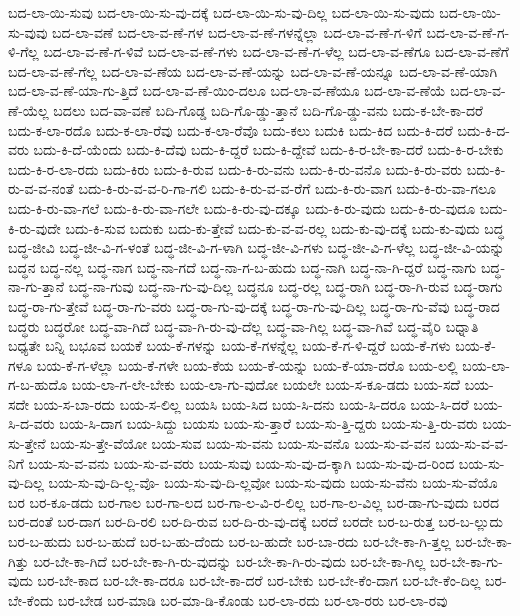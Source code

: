 {ಬದ-ಲಾ-ಯಿ-ಸುವು
ಬದ-ಲಾ-ಯಿ-ಸು-ವು-ದಕ್ಕೆ
ಬದ-ಲಾ-ಯಿ-ಸು-ವು-ದಿಲ್ಲ
ಬದ-ಲಾ-ಯಿ-ಸು-ವುದು
ಬದ-ಲಾ-ಯಿ-ಸು-ವುವು
ಬದ-ಲಾ-ವಣೆ
ಬದ-ಲಾ-ವ-ಣೆ-ಗಳ
ಬದ-ಲಾ-ವ-ಣೆ-ಗಳನ್ನೆಲ್ಲಾ
ಬದ-ಲಾ-ವ-ಣೆ-ಗ-ಳಿಗೆ
ಬದ-ಲಾ-ವ-ಣೆ-ಗ-ಳಿ-ಗೆಲ್ಲ
ಬದ-ಲಾ-ವ-ಣೆ-ಗ-ಳಿವೆ
ಬದ-ಲಾ-ವ-ಣೆ-ಗಳು
ಬದ-ಲಾ-ವ-ಣೆ-ಗ-ಳೆಲ್ಲ
ಬದ-ಲಾ-ವ-ಣೆಗೂ
ಬದ-ಲಾ-ವ-ಣೆಗೆ
ಬದ-ಲಾ-ವ-ಣೆ-ಗೆಲ್ಲ
ಬದ-ಲಾ-ವ-ಣೆಯ
ಬದ-ಲಾ-ವ-ಣೆ-ಯನ್ನು
ಬದ-ಲಾ-ವ-ಣೆ-ಯನ್ನೂ
ಬದ-ಲಾ-ವ-ಣೆ-ಯಾಗಿ
ಬದ-ಲಾ-ವ-ಣೆ-ಯಾ-ಗು-ತ್ತಿದೆ
ಬದ-ಲಾ-ವ-ಣೆ-ಯಿಂ-ದಲೂ
ಬದ-ಲಾ-ವ-ಣೆಯೂ
ಬದ-ಲಾ-ವ-ಣೆಯೆ
ಬದ-ಲಾ-ವ-ಣೆ-ಯೆಲ್ಲ
ಬದಲು
ಬದ-ವಾ-ವಣೆ
ಬದಿ-ಗೊಡ್ಡ
ಬದಿ-ಗೊ-ಡ್ಡು-ತ್ತಾನೆ
ಬದಿ-ಗೊ-ಡ್ಡು-ವನು
ಬದು-ಕ-ಬೇ-ಕಾ-ದರೆ
ಬದು-ಕ-ಲಾ-ರದೊ
ಬದು-ಕ-ಲಾ-ರೆವು
ಬದು-ಕ-ಲಾ-ರೆವೊ
ಬದು-ಕಲು
ಬದುಕಿ
ಬದು-ಕಿದ
ಬದು-ಕಿ-ದರೆ
ಬದು-ಕಿ-ದ-ವರು
ಬದು-ಕಿ-ದೆ-ಯೆಂದು
ಬದು-ಕಿ-ದೆವು
ಬದು-ಕಿ-ದ್ದರೆ
ಬದು-ಕಿ-ದ್ದೇವೆ
ಬದು-ಕಿ-ರ-ಬೇ-ಕಾ-ದರೆ
ಬದು-ಕಿ-ರ-ಬೇಕು
ಬದು-ಕಿ-ರ-ಲಾ-ರದು
ಬದು-ಕಿರು
ಬದು-ಕಿ-ರುವ
ಬದು-ಕಿ-ರು-ವನು
ಬದು-ಕಿ-ರು-ವನೊ
ಬದು-ಕಿ-ರು-ವರು
ಬದು-ಕಿ-ರು-ವ-ವ-ನಂತೆ
ಬದು-ಕಿ-ರು-ವ-ವ-ರಿ-ಗಾ-ಗಲಿ
ಬದು-ಕಿ-ರು-ವ-ವ-ರೆಗೆ
ಬದು-ಕಿ-ರು-ವಾಗ
ಬದು-ಕಿ-ರು-ವಾ-ಗಲೂ
ಬದು-ಕಿ-ರು-ವಾ-ಗಲೆ
ಬದು-ಕಿ-ರು-ವಾ-ಗಲೇ
ಬದು-ಕಿ-ರು-ವು-ದಕ್ಕೂ
ಬದು-ಕಿ-ರು-ವುದು
ಬದು-ಕಿ-ರು-ವುದೂ
ಬದು-ಕಿ-ರು-ವುದೇ
ಬದು-ಕಿ-ಸುವ
ಬದುಕು
ಬದು-ಕು-ತ್ತೇವೆ
ಬದು-ಕು-ವ-ವ-ರಲ್ಲ
ಬದು-ಕು-ವು-ದಕ್ಕೆ
ಬದು-ಕು-ವುದು
ಬದ್ಧ
ಬದ್ಧ-ಜೀವಿ
ಬದ್ಧ-ಜೀ-ವಿ-ಗ-ಳಂತೆ
ಬದ್ಧ-ಜೀ-ವಿ-ಗ-ಳಾಗಿ
ಬದ್ಧ-ಜೀ-ವಿ-ಗಳು
ಬದ್ಧ-ಜೀ-ವಿ-ಗ-ಳೆಲ್ಲ
ಬದ್ಧ-ಜೀ-ವಿ-ಯನ್ನು
ಬದ್ಧನ
ಬದ್ಧ-ನಲ್ಲ
ಬದ್ಧ-ನಾಗ
ಬದ್ಧ-ನಾ-ಗದೆ
ಬದ್ಧ-ನಾ-ಗ-ಬ-ಹುದು
ಬದ್ಧ-ನಾಗಿ
ಬದ್ಧ-ನಾ-ಗಿ-ದ್ದರೆ
ಬದ್ಧ-ನಾಗು
ಬದ್ಧ-ನಾ-ಗು-ತ್ತಾನೆ
ಬದ್ಧ-ನಾ-ಗುವು
ಬದ್ಧ-ನಾ-ಗು-ವು-ದಿಲ್ಲ
ಬದ್ಧನೂ
ಬದ್ಧ-ರಲ್ಲ
ಬದ್ಧ-ರಾಗಿ
ಬದ್ಧ-ರಾ-ಗಿ-ರುವ
ಬದ್ಧ-ರಾಗು
ಬದ್ಧ-ರಾ-ಗು-ತ್ತೇವೆ
ಬದ್ಧ-ರಾ-ಗು-ವರು
ಬದ್ಧ-ರಾ-ಗು-ವು-ದಕ್ಕೆ
ಬದ್ಧ-ರಾ-ಗು-ವು-ದಿಲ್ಲ
ಬದ್ಧ-ರಾ-ಗು-ವೆವು
ಬದ್ಧ-ರಾದ
ಬದ್ಧರು
ಬದ್ಧರೋ
ಬದ್ಧ-ವಾ-ಗಿದೆ
ಬದ್ಧ-ವಾ-ಗಿ-ರು-ವು-ದೆಲ್ಲ
ಬದ್ಧ-ವಾ-ಗಿಲ್ಲ
ಬದ್ಧ-ವಾ-ಗಿವೆ
ಬದ್ಧ-ವೈರಿ
ಬಧ್ನಾತಿ
ಬಧ್ಯತೇ
ಬನ್ನಿ
ಬಭೂವ
ಬಯಕೆ
ಬಯ-ಕೆ-ಗಳನ್ನು
ಬಯ-ಕೆ-ಗಳನ್ನೆಲ್ಲ
ಬಯ-ಕೆ-ಗ-ಳಿ-ದ್ದರೆ
ಬಯ-ಕೆ-ಗಳು
ಬಯ-ಕೆ-ಗಳೂ
ಬಯ-ಕೆ-ಗ-ಳೆಲ್ಲಾ
ಬಯ-ಕೆ-ಗಳೇ
ಬಯ-ಕೆಯ
ಬಯ-ಕೆ-ಯನ್ನು
ಬಯ-ಕೆ-ಯಾ-ದರೊ
ಬಯ-ಲಲ್ಲಿ
ಬಯ-ಲಾ-ಗ-ಬ-ಹುದೊ
ಬಯ-ಲಾ-ಗ-ಲೇ-ಬೇಕು
ಬಯ-ಲಾ-ಗು-ವುದೋ
ಬಯಲೇ
ಬಯ-ಸ-ಕೂ-ಡದು
ಬಯ-ಸದೆ
ಬಯ-ಸದೇ
ಬಯ-ಸ-ಬಾ-ರದು
ಬಯ-ಸ-ಲಿಲ್ಲ
ಬಯಸಿ
ಬಯ-ಸಿದ
ಬಯ-ಸಿ-ದನು
ಬಯ-ಸಿ-ದರೂ
ಬಯ-ಸಿ-ದರೆ
ಬಯ-ಸಿ-ದ-ವರು
ಬಯ-ಸಿ-ದಾಗ
ಬಯ-ಸಿದ್ದು
ಬಯಸು
ಬಯ-ಸು-ತ್ತಾರೆ
ಬಯ-ಸು-ತ್ತಿ-ದ್ದರು
ಬಯ-ಸು-ತ್ತಿ-ರು-ವರು
ಬಯ-ಸು-ತ್ತೇನೆ
ಬಯ-ಸು-ತ್ತೇ-ವೆಯೋ
ಬಯ-ಸುವ
ಬಯ-ಸು-ವನು
ಬಯ-ಸು-ವನೊ
ಬಯ-ಸು-ವ-ವನ
ಬಯ-ಸು-ವ-ವ-ನಿಗೆ
ಬಯ-ಸು-ವ-ವನು
ಬಯ-ಸು-ವ-ವರು
ಬಯ-ಸುವು
ಬಯ-ಸು-ವು-ದ-ಕ್ಕಾಗಿ
ಬಯ-ಸು-ವು-ದ-ರಿಂದ
ಬಯ-ಸು-ವು-ದಿಲ್ಲ
ಬಯ-ಸು-ವು-ದಿ-ಲ್ಲ-ವೊ-
ಬಯ-ಸು-ವು-ದಿ-ಲ್ಲವೋ
ಬಯ-ಸು-ವುದು
ಬಯ-ಸು-ವೆನು
ಬಯ-ಸು-ವೆಯೊ
ಬರ
ಬರ-ಕೂ-ಡದು
ಬರ-ಗಾಲ
ಬರ-ಗಾ-ಲದ
ಬರ-ಗಾ-ಲ-ವಿ-ರ-ಲಿಲ್ಲ
ಬರ-ಗಾ-ಲ-ವಿಲ್ಲ
ಬರ-ಡಾ-ಗು-ವುದು
ಬರದ
ಬರ-ದಂತೆ
ಬರ-ದಾಗ
ಬರ-ದಿ-ರಲಿ
ಬರ-ದಿ-ರುವ
ಬರ-ದಿ-ರು-ವು-ದಕ್ಕೆ
ಬರದೆ
ಬರದೇ
ಬರ-ಬ-ರುತ್ತ
ಬರ-ಬ-ಲ್ಲುದು
ಬರ-ಬ-ಹುದು
ಬರ-ಬ-ಹುದೆ
ಬರ-ಬ-ಹು-ದೆಂದು
ಬರ-ಬ-ಹುದೇ
ಬರ-ಬಾ-ರದು
ಬರ-ಬೇ-ಕಾ-ಗಿ-ತ್ತಲ್ಲ
ಬರ-ಬೇ-ಕಾ-ಗಿತ್ತು
ಬರ-ಬೇ-ಕಾ-ಗಿದೆ
ಬರ-ಬೇ-ಕಾ-ಗಿ-ರು-ವುದನ್ನು
ಬರ-ಬೇ-ಕಾ-ಗಿ-ರು-ವುದು
ಬರ-ಬೇ-ಕಾ-ಗಿಲ್ಲ
ಬರ-ಬೇ-ಕಾ-ಗು-ವುದು
ಬರ-ಬೇ-ಕಾದ
ಬರ-ಬೇ-ಕಾ-ದರೂ
ಬರ-ಬೇ-ಕಾ-ದರೆ
ಬರ-ಬೇಕು
ಬರ-ಬೇ-ಕೆಂ-ದಾಗ
ಬರ-ಬೇ-ಕೆಂ-ದಿಲ್ಲ
ಬರ-ಬೇ-ಕೆಂದು
ಬರ-ಬೇಡ
ಬರ-ಮಾಡಿ
ಬರ-ಮಾ-ಡಿ-ಕೊಂಡು
ಬರ-ಲಾ-ರದು
ಬರ-ಲಾ-ರರು
ಬರ-ಲಾ-ರವು
}
